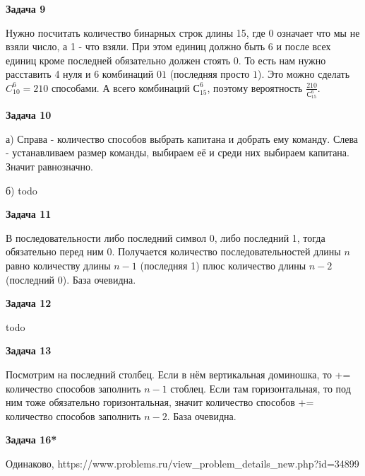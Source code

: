 \begin{center}
\textbf{Задача 9}
\end{center}
Нужно посчитать количество бинарных строк длины 15, где $\displaystyle 0$ означает что мы не взяли число, а 1 - что взяли. При этом единиц должно быть 6 и после всех единиц кроме последней обязательно должен стоять 0. То есть нам нужно расставить 4 нуля и 6 комбинаций $\displaystyle 01$ (последняя просто $\displaystyle 1$). Это можно сделать $\displaystyle C_{10}^{6} =210$ способами. А всего комбинаций $\displaystyle С_{15}^{6}$, поэтому вероятность $\displaystyle \frac{210}{С_{15}^{6}}$.

\begin{center}
\textbf{Задача 10}
\end{center}
а) Справа - количество способов выбрать капитана и добрать ему команду. Слева - устанавливаем размер команды, выбираем её и среди них выбираем капитана. Значит равнозначно.

б) todo

\begin{center}
\textbf{Задача 11}
\end{center}
В последовательности либо последний символ 0, либо последний 1, тогда обязательно перед ним 0. Получается количество последовательностей длины $\displaystyle n$ равно количеству длины $\displaystyle n-1$ (последняя 1) плюс количество длины $\displaystyle n-2$ (последний 0). База очевидна.

\begin{center}
\textbf{Задача 12}
\end{center}
todo

\begin{center}
\textbf{Задача 13}
\end{center}
Посмотрим на последний столбец. Если в нём вертикальная доминошка, то += количество способов заполнить $\displaystyle n-1$ стоблец. Если там горизонтальная, то под ним тоже обязательно горизонтальная, значит количество способов += количество способов заполнить $\displaystyle n-2$. База очевидна.

\begin{center}
\textbf{Задача 16*}
\end{center}
Одинаково, https://www.problems.ru/view\_problem\_details\_new.php?id=34899
